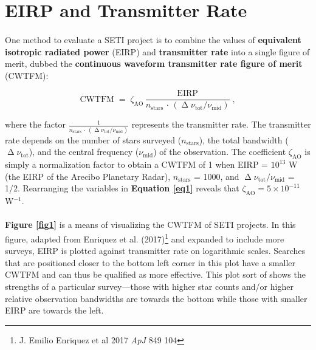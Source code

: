 \documentclass{article}
\begin{document}
\section{EIRP and Transmitter Rate}

\paragraph{}
One method to evaluate a SETI project is to combine the values of \textbf{equivalent isotropic radiated power} (EIRP) and \textbf{transmitter rate} into a single figure of merit, dubbed the \textbf{continuous waveform transmitter rate figure of merit} (CWTFM):

\begin{equation}
\textrm{CWTFM} \; = \; \zeta_{\textrm{AO}} \, \frac{\textrm{EIRP}}{n_{\textrm{stars}} \, \cdot \, (\upDelta \nu_{\textrm{tot}} / \nu_{\textrm{mid}})} \; ,
\label{eq1}
\end{equation}

where the factor $\frac{1}{n_{\textrm{stars}} \, \cdot \, (\upDelta \nu_{\textrm{tot}} / \nu_{\textrm{mid}})}$ represents the transmitter rate. The transmitter rate depends on the number of stars surveyed ($n_{\textrm{stars}}$), the total bandwidth ($\upDelta \nu_{\textrm{tot}}$), and the central frequency ($\nu_{\textrm{mid}}$) of the observation. The coefficient $\zeta_{\textrm{AO}}$ is simply a normalization factor to obtain a CWTFM of 1 when EIRP = $10^{13}$ W (the EIRP of the Arecibo Planetary Radar),  $n_{\textrm{stars}}$ = 1000, and $\upDelta \nu_{\textrm{tot}} / \nu_{\textrm{mid}}$ = 1/2. Rearranging the variables in \textbf{Equation \ref{eq1}} reveals that $\zeta_{\textrm{AO}} = 5 \times 10^{-11}$ W$^{-1}$.

\paragraph{}
\textbf{Figure \ref{fig1}} is a means of visualizing the CWTFM of SETI projects. In this figure, adapted from Enriquez et al. (2017)\footnote{J. Emilio Enriquez et al 2017 \textit{ApJ} 849 104} and expanded to include more surveys, EIRP is plotted against transmitter rate on logarithmic scales. Searches that are positioned closer to the bottom left corner in this plot have a smaller CWTFM and can thus be qualified as more effective. This plot sort of shows the strengths of a particular survey---those with higher star counts and/or higher relative observation bandwidths are towards the bottom while those with smaller EIRP are towards the left.
\end{document}
